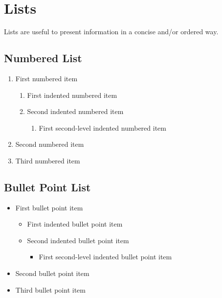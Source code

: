 \documentclass[
	11pt,
	fleqn,
	a4paper,
]{LegrandOrangeBook}
\begin{document}

\section{Lists}

Lists are useful to present information in a concise and/or ordered way.

\subsection{Numbered List}

\begin{enumerate}
    \item First numbered item
          \begin{enumerate}
              \item First indented numbered item
              \item Second indented numbered item
                    \begin{enumerate}
                        \item First second-level indented numbered item
                    \end{enumerate}
          \end{enumerate}
    \item Second numbered item
    \item Third numbered item
\end{enumerate}

\subsection{Bullet Point List}

\begin{itemize}
    \item First bullet point item
          \begin{itemize}
              \item First indented bullet point item
              \item Second indented bullet point item
                    \begin{itemize}
                        \item First second-level indented bullet point item
                    \end{itemize}
          \end{itemize}
    \item Second bullet point item
    \item Third bullet point item
\end{itemize}
\end{document}
